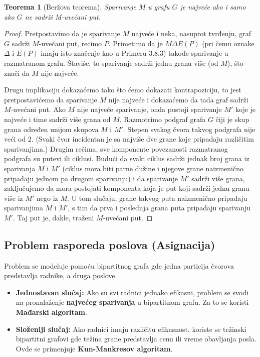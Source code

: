 \documentclass[a4paper,12pt]{article}
\numberwithin{algorithm}{section}
\theoremstyle{plain}
\newtheorem{theorem}{Teorema}[section]
\theoremstyle{definition}
\theoremstyle{remark}
\begin{document}
\begin{theorem}[Beržova teorema]
    Sparivanje $M$ u grafu $G$ je najveće ako i samo ako $G$ ne sadrži M-uvećani put.
\end{theorem}
\begin{proof}
    Pretpostavimo da je sparivanje $M$ najveće i neka, nasuprot tvrđenju, graf $G$ sadrži $M$-uvećani put, recimo $P$. Primetimo da je $M \Delta E(P)$ (pri čemu oznake $\Delta$ i $E(P)$ imaju isto značenje kao u Primeru 3.8.3) takođe sparivanje u razmatranom grafu. Štaviše, to sparivanje sadrži jednu granu više (od $M$), što znači da $M$ nije najveće.

    Drugu implikaciju dokazaćemo tako što ćemo dokazati kontrapoziciju, to jest pretpostavićemo da sparivanje $M$ nije najveće i dokazaćemo da tada graf sadrži $M$-uvećani put. Ako $M$ nije najveće sparivanje, onda postoji sparivanje $M'$ koje je najveće i time sadrži više grana od $M$. Razmotrimo podgraf grafa $G$ čiji je skup grana određen unijom skupova $M$ i $M'$. Stepen svakog čvora takvog podgrafa nije veći od 2. (Svaki čvor incidentan je sa najviše dve grane koje pripadaju različitim sparivanjima.) Drugim rečima, sve komponente povezanosti razmatranog podgrafa su putevi ili ciklusi. Budući da svaki ciklus sadrži jednak broj grana iz sparivanja $M$ i $M'$ (ciklus mora biti parne dužine i njegove grane naizmenično pripadaju jednom pa drugom sparivanju) i da sparivanje $M'$ sadrži više grana, zaključujemo da mora postojati komponenta koja je put koji sadrži jednu granu više iz $M'$ nego iz $M$. U tom slučaju, grane takvog puta naizmenično pripadaju sparivanjima $M$ i $M'$, s tim da prva i poslednja grana puta pripadaju sparivanju $M'$. Taj put je, dakle, traženi $M$-uvećani put.
\end{proof}

\subsection*{Problem rasporeda poslova (Asignacija)}
Problem se modeluje pomoću bipartitnog grafa gde jedna particija čvorova predstavlja radnike, a druga poslove.

\begin{itemize}
    \item \textbf{Jednostavan slučaj:} Ako su svi radnici jednako efikasni, problem se svodi na pronalaženje \textbf{najvećeg sparivanja} u bipartitnom grafu. Za to se koristi \textbf{Mađarski algoritam}.
    \item \textbf{Složeniji slučaj:} Ako radnici imaju različitu efikasnost, koriste se težinski bipartitni grafovi gde težina grane predstavlja cenu ili vreme obavljanja posla. Ovde se primenjuje \textbf{Kun-Mankresov algoritam}.
\end{itemize}
\end{document}
